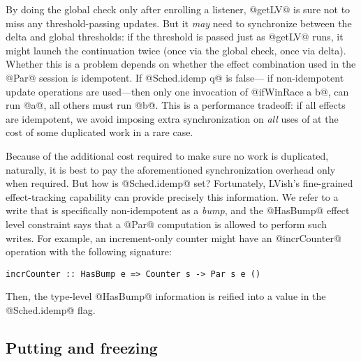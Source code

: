 By doing the global check only after enrolling a listener, @getLV@ is
sure not to miss any threshold-passing updates.  But it \emph{may}
need to synchronize between the delta and global thresholds: if the
threshold is passed just as @getLV@ runs, it might launch the
continuation twice (once via the global check, once via delta).  Whether this 
is a problem depends on whether the effect combination used in the @Par@ session
is idempotent.
%
If @Sched.idemp q@ is false---\ie{} if non-idempotent update operations
are used---then only one invocation of @ifWinRace a b@, can run @a@, all others
must run @b@.  {This is a performance tradeoff: if all effects are idempotent, we
avoid imposing extra synchronization on \emph{all} uses of  at
the cost of some duplicated work in a rare case.}


\ifdefined\JOURNAL

Because of the additional cost required to make sure no work is duplicated,
naturally, it is best to pay the aforementioned synchronization overhead only
when required.  But how is @Sched.idemp@ set?
%
Fortunately, LVish's fine-grained effect-tracking capability can provide
precisely this information.  We
refer to a write that is specifically non-idempotent as a \emph{bump}, and the
@HasBump@ effect level constraint says that a @Par@ computation is allowed to
perform such writes.  For example, an increment-only counter might have an
@incrCounter@ operation with the following signature:
%
\begin{lstlisting}
incrCounter :: HasBump e => Counter s -> Par s e ()
\end{lstlisting}
%
Then, the type-level @HasBump@ information is reified into a value in the 
@Sched.idemp@ flag.

\fi

\subsection{Putting and freezing}


\singlespacing

\doublespacing


